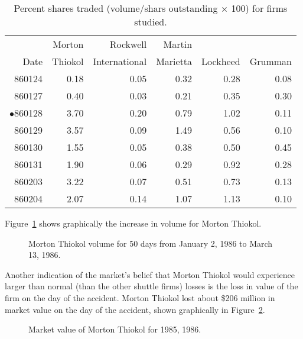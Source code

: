 \begin{table}[h!]
\caption{Percent shares traded (volume/shars outstanding
$\times$ 100) for firms studied.}
\sffamily
\begin{tabular*}{6in}{r@{\extracolsep{1em}}rrrrr}
\hline\hline       
       &  Morton & Rockwell & Martin &          &         \\
Date   &  Thiokol & International & Marietta & Lockheed & Grumman \\
\hline
860124 &   0.18 &   0.05 &   0.32 &   0.28 &   0.08  \\
860127 &   0.40 &   0.03 &   0.21 &   0.35 &   0.30  \\
$\bullet$860128 &   3.70 &   0.20 &   0.79 &   1.02 &   0.11  \\
860129 &   3.57 &   0.09 &   1.49 &   0.56 &   0.10  \\
860130 &   1.55 &   0.05 &   0.38 &   0.50 &   0.45  \\
860131 &   1.90 &   0.06 &   0.29 &   0.92 &   0.28  \\
860203 &   3.22 &   0.07 &   0.51 &   0.73 &   0.13  \\
860204 &   2.07 &   0.14 &   1.07 &   1.13 &   0.10  \\ \hline
\end{tabular*}
\label{percenttraded}
\end{table}

Figure~\ref{thvol} shows graphically the increase in volume
for Morton Thiokol.

\begin{figure}[hp]
\begin{center}

\end{center}
\caption{Morton Thiokol volume for 50 days from January 2,
1986 to March 13, 1986.}
\label{thvol}
\end{figure}


Another indication of the market's belief that Morton
Thiokol would experience larger than normal (than the other
shuttle firms) losses is the loss in value of the firm on
the day of the accident.
Morton Thiokol lost about \$206 million in market value on
the day of the accident, shown graphically in
Figure~\ref{thval}.

\begin{figure}[hp]
\begin{center}

\end{center}
\caption{Market value of Morton Thiokol for 1985, 1986.}
\label{thval}
\end{figure}

